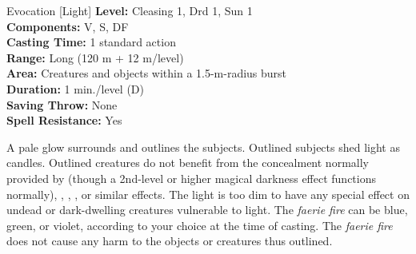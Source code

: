 {Evocation [Light]}
{
	\textbf{Level:}
	Cleasing 1, Drd 1, Sun 1\\
	\textbf{Components:}
	V, S, DF\\
	\textbf{Casting Time:}
	1 standard action\\
	\textbf{Range:}
	Long (120 m + 12 m/level)\\
	\textbf{Area:}
	Creatures and objects within a 1.5-m-radius burst\\
	\textbf{Duration:}
	1 min./level (D)\\
	\textbf{Saving Throw:}
	None\\
	\textbf{Spell Resistance:}
	Yes\\
}
{
	A pale glow surrounds and outlines the subjects. Outlined subjects shed light as candles. Outlined creatures do not benefit from the concealment normally provided by  (though a 2nd-level or higher magical darkness effect functions normally), , , , or similar effects. The light is too dim to have any special effect on undead or dark-dwelling creatures vulnerable to light. The \emph{faerie fire} can be blue, green, or violet, according to your choice at the time of casting. The \emph{faerie fire} does not cause any harm to the objects or creatures thus outlined.

}
